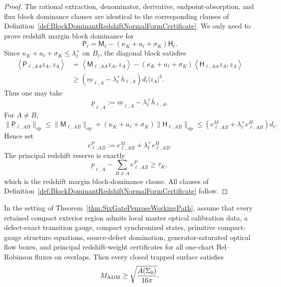\begin{proof}
The rational extraction, denominator, derivative, endpoint-absorption, and flux
block dominance clauses are identical to the corresponding clauses of
Definition~\ref{def:BlockDominantRedshiftNormalFormCertificate}.  We only need
to prove redshift margin block dominance for
\[
    \mathsf P_\ell
    =
    \mathsf M_\ell
    -
    (\kappa_K+a_\ell+\sigma_K)\mathsf H_\ell .
\]
Since $\kappa_K+a_\ell+\sigma_K\le\lambda_\ell^+$ on $B_\ell$, the diagonal
block satisfies
\[
\begin{split}
    \left\langle \mathsf P_{\ell,AA}z_A,z_A\right\rangle
    &=
    \left\langle \mathsf M_{\ell,AA}z_A,z_A\right\rangle
    -
    (\kappa_K+a_\ell+\sigma_K)
    \left\langle \mathsf H_{\ell,AA}z_A,z_A\right\rangle \\
    &\ge
    \left(
        \underline m_{\ell,A}
        -
        \lambda_\ell^+\overline h_{\ell,A}
    \right)d_\ell |z_A|^2 .
\end{split}
\]
Thus one may take
\[
    \underline p_{\ell,A}
    :=
    \underline m_{\ell,A}-\lambda_\ell^+\overline h_{\ell,A}.
\]
For $A\ne B$,
\[
    \|\mathsf P_{\ell,AB}\|_{\mathrm{op}}
    \le
    \|\mathsf M_{\ell,AB}\|_{\mathrm{op}}
    +
    (\kappa_K+a_\ell+\sigma_K)\|\mathsf H_{\ell,AB}\|_{\mathrm{op}}
    \le
    \left(e^M_{\ell,AB}+\lambda_\ell^+e^H_{\ell,AB}\right)d_\ell .
\]
Hence set
\[
    e^P_{\ell,AB}
    :=
    e^M_{\ell,AB}+\lambda_\ell^+e^H_{\ell,AB}.
\]
The principal redshift reserve is exactly
\[
    \underline p_{\ell,A}-\sum_{B\ne A}e^P_{\ell,AB}\ge\tau_K,
\]
which is the redshift margin block-dominance clause.  All clauses of
Definition~\ref{def:BlockDominantRedshiftNormalFormCertificate} follow.
\end{proof}

\begin{corollary}\label{cor:PrincipalRedshiftLocalRoutePenrose}
In the setting of Theorem~\ref{thm:SixGatePenroseWorkingPath}, assume that every
retained compact exterior region admits local master optical calibration data, a
defect-exact transition gauge, compact synchronized states, primitive
compact-gauge structure equations, source-defect domination, generator-saturated
optical flow boxes, and principal redshift-weight certificates for all one-chart
Bel--Robinson fluxes on overlaps. Then every closed trapped surface satisfies
\[
    M_{\mathrm{ADM}}\ge \sqrt{\frac{A(\Sigma_0)}{16\pi}} .
\]
\end{corollary}

